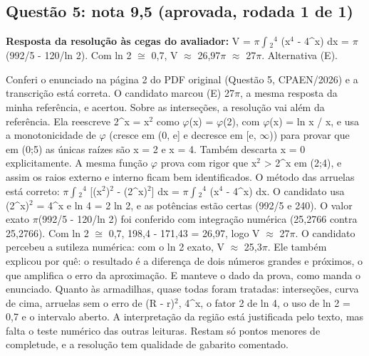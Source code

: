 \documentclass{article}%
\begin{document}
\subsection*{Questão 5: nota 9,5 (aprovada, rodada 1 de 1)}%
\textbf{Resposta da resolução às cegas do avaliador:} V = $\pi$$\int$$_{2}$$^{4}$ (x$^{4}$ - 4\^{}x) dx = $\pi$(992/5 - 120/ln 2). Com ln 2 $\cong$ 0,7, V $\approx$ 26,97$\pi$ $\approx$ 27$\pi$. Alternativa (E).\par %
Conferi o enunciado na página 2 do PDF original (Questão 5, CPAEN/2026) e a transcrição está correta. O candidato marcou (E) 27$\pi$, a mesma resposta da minha referência, e acertou.\newline%
\newline%
Sobre as interseções, a resolução vai além da referência. Ela reescreve 2\^{}x = x$^2$ como $\varphi$(x) = $\varphi$(2), com $\varphi$(x) = ln x / x, e usa a monotonicidade de $\varphi$ (cresce em (0, e{]} e decresce em {[}e, $\infty$)) para provar que em (0;5) as únicas raízes são x = 2 e x = 4. Também descarta x = 0 explicitamente.\newline%
\newline%
A mesma função $\varphi$ prova com rigor que x$^2$ > 2\^{}x em (2;4), e assim os raios externo e interno ficam bem identificados. O método das arruelas está correto: $\pi$$\int$$_{2}$$^{4}$ {[}(x$^2$)$^2$ - (2\^{}x)$^2${]} dx = $\pi$$\int$$_{2}$$^{4}$ (x$^{4}$ - 4\^{}x) dx. O candidato usa (2\^{}x)$^2$ = 4\^{}x e ln 4 = 2 ln 2, e as potências estão certas (992/5 e 240). O valor exato $\pi$(992/5 - 120/ln 2) foi conferido com integração numérica (25,2766 contra 25,2766). Com ln 2 $\cong$ 0,7, 198,4 - 171,43 = 26,97, logo V $\approx$ 27$\pi$.\newline%
\newline%
O candidato percebeu a sutileza numérica: com o ln 2 exato, V $\approx$ 25,3$\pi$. Ele também explicou por quê: o resultado é a diferença de dois números grandes e próximos, o que amplifica o erro da aproximação. E manteve o dado da prova, como manda o enunciado.\newline%
\newline%
Quanto às armadilhas, quase todas foram tratadas: interseções, curva de cima, arruelas sem o erro de (R - r)$^2$, 4\^{}x, o fator 2 de ln 4, o uso de ln 2 = 0,7 e o intervalo aberto. A interpretação da região está justificada pelo texto, mas falta o teste numérico das outras leituras. Restam só pontos menores de completude, e a resolução tem qualidade de gabarito comentado.%
\begin{itemize}%

\end{itemize}$$
\end{document}
